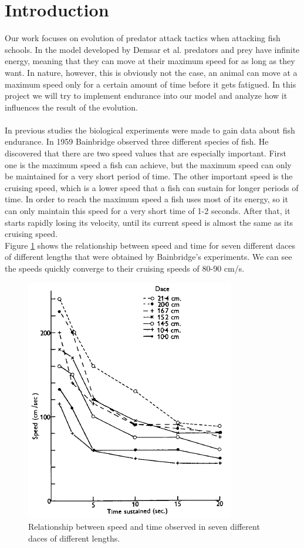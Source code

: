 \documentclass[internal]{FRIreport}
\begin{document}
\section{Introduction}
%
Our work focuses on evolution of predator attack tactics when attacking fish schools. In the model developed by Demsar et al. \cite{demvsar2015simulating} predators and prey have infinite energy, meaning that they can move at their maximum speed for as long as they want. In nature, however, this is obviously not the case, an animal can move at a maximum speed only for a certain amount of time before it gets fatigued. In this project we will try to implement endurance into our model and analyze how it influences the result of the evolution.
~\\\\
In previous studies the biological experiments were made to gain data about fish endurance. In 1959 Bainbridge \cite{bainbridge1960speed} observed three different species of fish. He discovered that there are two speed values that are especially important. First one is the maximum speed a fish can achieve, but the maximum speed can only be maintained for a very short period of time. The other important speed is the cruising speed, which is a lower speed that a fish can sustain for longer periods of time. In order to reach the maximum speed a fish uses most of its energy, so it can only maintain this speed for a very short time of 1-2 seconds. After that, it starts rapidly losing its velocity, until its current speed is almost the same as its cruising speed. \\
Figure \ref{ref:graf1} shows the relationship between speed and time for seven different daces of different lengths that were obtained by Bainbridge's experiments. We can see the speeds quickly converge to their cruising speeds of 80-90 cm/s. 
\begin{figure}[htb]
\label{ref:graf1}
\centering
\includegraphics[scale=0.9]{1.png}
\caption{Relationship between speed and time observed in seven different daces of different lengths.}
\end{figure} \hfill \break
\end{document}
